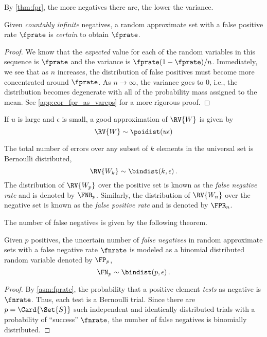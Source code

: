 \documentclass[ ../main.tex]{subfiles}
\begin{document}
By \cref{thm:fpr}, the more negatives there are, the lower the variance.
\begin{corollary}
\label{cor:fpr_as_vareps}
	Given \emph{countably infinite} negatives, a random approximate set with a false positive rate $\fprate$ is \emph{certain} to obtain $\fprate$.
\end{corollary}
\begin{proof}
We know that the \emph{expected} value for each of the random variables in this sequence is $\fprate$ and the variance is $\fprate(1-\fprate)/n$.
Immediately, we see that as $n$ increases, the distribution of false positives must become more concentrated around $\fprate$.
As $n \to \infty$, the variance goes to $0$, i.e., the distribution becomes degenerate with all of the probability mass assigned to the mean. See \cref{app:cor_fpr_as_vareps} for a more rigorous proof.
\end{proof}

If $u$ is large and $\epsilon$ is small, a good approximation of $\RV{W}$ is given by
\begin{equation}
	\RV{W} \sim \poidist(u \epsilon)
\end{equation}


The total number of errors over any subset of $k$ elements in the universal set is Bernoulli distributed,
\begin{equation}
	\RV{W_k} \sim \bindist(k, \epsilon)\,.
\end{equation}
The distribution of $\RV{W_p}$ over the positive set is known as the \emph{false negative rate} and is denoted by $\FNR_p$.
Similarly, the distribution of $\RV{W_n}$ over the negative set is known as the \emph{false positive rate} and is denoted by $\FPR_n$.




The number of false negatives is given by the following theorem.
\begin{theorem}
\label{thm:fnbinom}
Given $p$ positives, the uncertain number of \emph{false negatives} in random approximate sets with a false negative rate $\fnrate$ is modeled as a binomial distributed random variable denoted by $\FP_p$,
\begin{equation}
	\FN_p \sim \bindist(p, \epsilon)\,.
\end{equation}
\end{theorem}
\begin{proof}
By \cref{asm:fprate}, the probability that a positive element \emph{tests} as negative is $\fnrate$.
Thus, each test is a Bernoulli trial.
Since there are $p = \Card{\Set{S}}$ such independent and identically distributed trials with a probability of ``success'' $\fnrate$, the number of false negatives is binomially distributed.
\end{proof}
\end{document}
